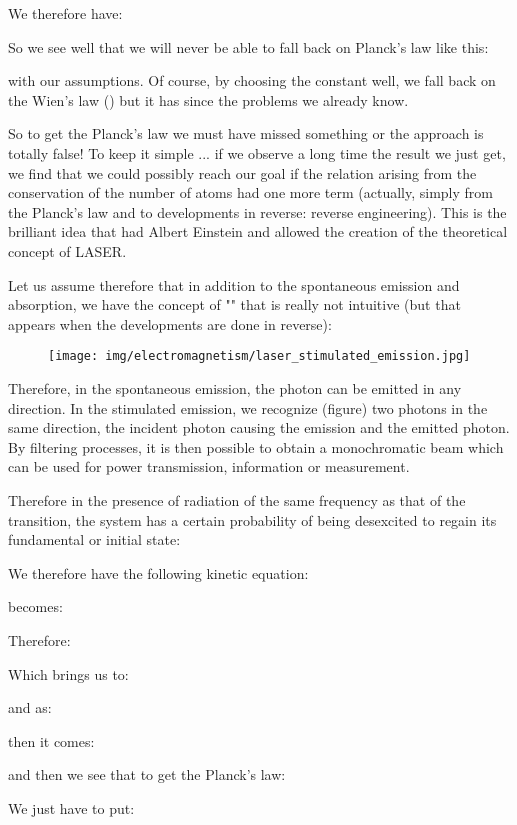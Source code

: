 	We therefore have:
	
	So we see well that we will never be able to fall back on Planck's law like this:
	
	with our assumptions. Of course, by choosing the constant well, we fall back on the Wien's law () but it has since the problems we already know.

	So to get the Planck's law we must have missed something or the approach is totally false! To keep it simple ... if we observe a long time the result we just get, we find that we could possibly reach our goal if the relation arising from the conservation of the number of atoms had one more term (actually, simply from the Planck's law and to developments in reverse: reverse engineering). This is the brilliant idea that had Albert Einstein and allowed the creation of the theoretical concept of LASER.

	Let us assume therefore that in addition to the spontaneous  emission and absorption, we have the concept of "" that is really not intuitive (but that appears when the developments are done in reverse):
	\begin{figure}[H]
		\centering
		\texttt{[image: img/electromagnetism/laser\_stimulated\_emission.jpg]}
	\end{figure}
	Therefore, in the spontaneous emission, the photon can be emitted in any direction. In the stimulated emission, we recognize (figure) two photons in the same direction, the incident photon causing the emission and the emitted photon. By filtering processes, it is then possible to obtain a monochromatic beam which can be used for power transmission, information or measurement.

	Therefore in the presence of radiation of the same frequency as that of the transition, the system has a certain probability of being desexcited to regain its fundamental or initial state:
		
	We therefore have the following kinetic equation:
	
	becomes:
	
	Therefore:
	
	Which brings us to:
	
	and as:
	
	then it comes:
	
	and then we see that to get the Planck's law:
	
	We just have to put:
	
